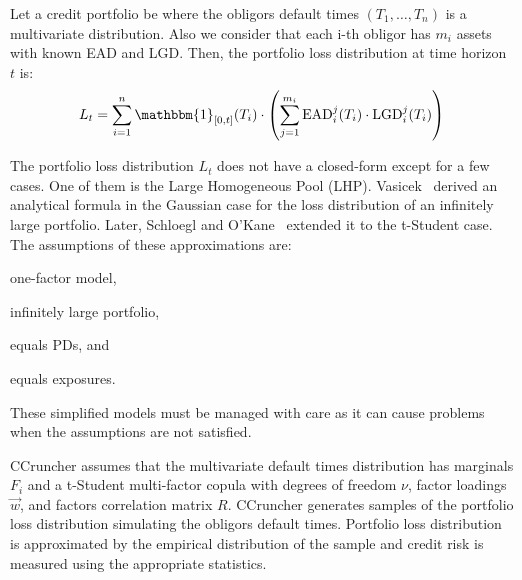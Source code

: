 \documentclass[11pt,fleqn]{book} %
\begin{document}
Let a credit portfolio be where the obligors default times $(T_1,\dots,T_n)$ 
is a multivariate distribution. Also we consider that each i-th obligor has 
$m_i$ assets with known EAD and LGD\@. Then, the portfolio loss distribution 
at time horizon $t$ is:
\begin{displaymath}
	L_t = \displaystyle \sum_{i=1}^n \mathbbm{1}_{[0,t]}(T_i) \cdot 
	\left( 
	\sum_{j=1}^{m_i} \text{EAD}_i^j(T_i) \cdot \text{LGD}_i^j(T_i)
	\right)
\end{displaymath}

The portfolio loss distribution $L_t$ does not have a closed-form except 
for a few cases. One of them is the Large Homogeneous Pool (LHP).
Vasicek~\cite{vasicek:1987} derived an analytical formula in the Gaussian 
case for the loss distribution of an infinitely large portfolio. Later, 
Schloegl and O'Kane~\cite{schloegl:2005} extended it to the t-Student 
case. The assumptions of these approximations are: 
\begin{inparaenum}[1)]
	\item one-factor model, 
	\item infinitely large portfolio, 
	\item equals PDs, and
	\item equals exposures.
\end{inparaenum}
These simplified models must be managed 
with care as it can cause problems~\cite{long:2012} when the assumptions 
are not satisfied.

CCruncher assumes that the multivariate default times distribution has
marginals $F_i$ and a t-Student multi-factor copula with degrees 
of freedom $\nu$, factor loadings $\vec{w}$, and factors correlation matrix 
$R$. CCruncher generates samples of the portfolio loss distribution simulating 
the obligors default times. Portfolio loss distribution is approximated by the 
empirical distribution of the sample and credit risk is measured using the 
appropriate statistics.
\end{document}
